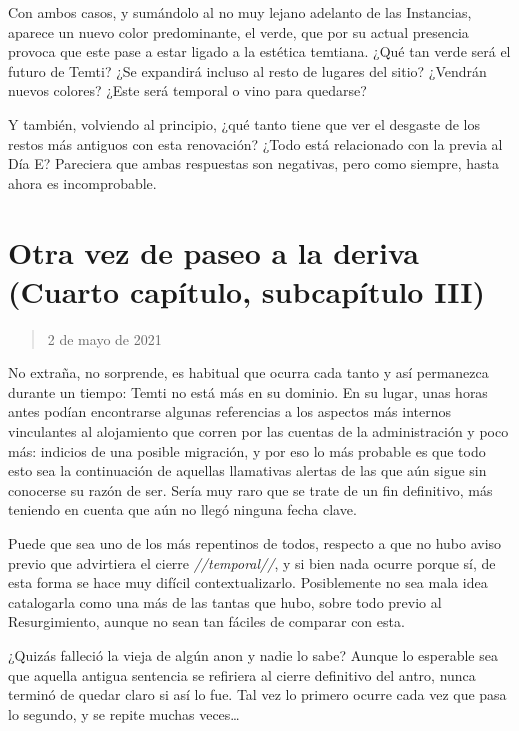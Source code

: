 \documentclass[
  spanish,
]{book}
\begin{document}
Con ambos casos, y sumándolo al no muy lejano adelanto de las Instancias, aparece un nuevo color predominante, el verde, que por su actual presencia provoca que este pase a estar ligado a la estética temtiana. ¿Qué tan verde será el futuro de Temti? ¿Se expandirá incluso al resto de lugares del sitio? ¿Vendrán nuevos colores? ¿Este será temporal o vino para quedarse?

Y también, volviendo al principio, ¿qué tanto tiene que ver el desgaste de los restos más antiguos con esta renovación? ¿Todo está relacionado con la previa al Día E? Pareciera que ambas respuestas son negativas, pero como siempre, hasta ahora es incomprobable.

\hypertarget{otra-vez-de-paseo-a-la-deriva-cuarto-capuxedtulo-subcapuxedtulo-iii}{%
\section{Otra vez de paseo a la deriva (Cuarto capítulo, subcapítulo III)}\label{otra-vez-de-paseo-a-la-deriva-cuarto-capuxedtulo-subcapuxedtulo-iii}}

\begin{quote}
2 de mayo de 2021
\end{quote}

No extraña, no sorprende, es habitual que ocurra cada tanto y así permanezca durante un tiempo: Temti no está más en su dominio. En su lugar, unas horas antes podían encontrarse algunas referencias a los aspectos más internos vinculantes al alojamiento que corren por las cuentas de la administración y poco más: indicios de una posible migración, y por eso lo más probable es que todo esto sea la continuación de aquellas llamativas alertas de las que aún sigue sin conocerse su razón de ser. Sería muy raro que se trate de un fin definitivo, más teniendo en cuenta que aún no llegó ninguna fecha clave.

Puede que sea uno de los más repentinos de todos, respecto a que no hubo aviso previo que advirtiera el cierre \emph{//temporal//}, y si bien nada ocurre porque sí, de esta forma se hace muy difícil contextualizarlo. Posiblemente no sea mala idea catalogarla como una más de las tantas que hubo, sobre todo previo al Resurgimiento, aunque no sean tan fáciles de comparar con esta.

¿Quizás falleció la vieja de algún anon y nadie lo sabe? Aunque lo esperable sea que aquella antigua sentencia se refiriera al cierre definitivo del antro, nunca terminó de quedar claro si así lo fue. Tal vez lo primero ocurre cada vez que pasa lo segundo, y se repite muchas veces\ldots{}
\end{document}
